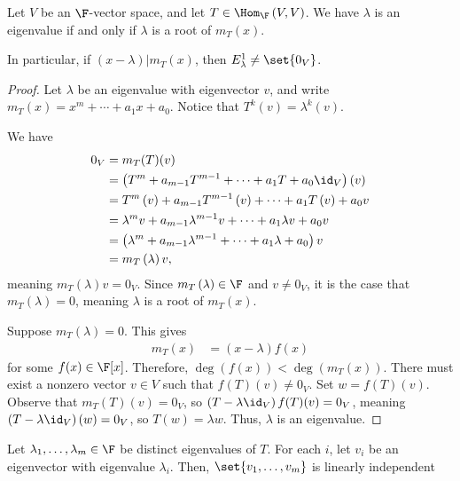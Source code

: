 \documentclass[10pt]{mypackage}
\begin{document}
\begin{theorem}
  Let $V$ be an $\F$-vector space, and let $T\in \Hom_{\F}\left(V,V\right)$. We have $\lambda$ is an eigenvalue if and only if $\lambda$ is a root of $m_{T}\left(x\right)$.\newline

  In particular, if $\left(x-\lambda\right)\vert m_T(x)$, then $E^{1}_{\lambda}\neq \set{0_V}$.
\end{theorem}
\begin{proof}
  Let $\lambda$ be an eigenvalue with eigenvector $v$, and write $m_{T}\left(x\right) = x^m + \cdots + a_1x + a_0$. Notice that $T^{k}\left(v\right) = \lambda^{k}\left(v\right)$.\newline

  We have 
  \begin{align*}
    0_V &= m_T(T)(v)\\
        &= \left(T^{m} + a_{m-1}T^{m-1} + \cdots + a_1T + a_0\id_V\right)\left(v\right)\\
        &= T^{m}\left(v\right) + a_{m-1}T^{m-1}\left(v\right) + \cdots + a_1T\left(v\right) + a_0 v\\
        &= \lambda^{m}v + a_{m-1}\lambda^{m-1}v + \cdots + a_1\lambda v + a_0 v\\
        &= \left(\lambda^{m} + a_{m-1}\lambda^{m-1} + \cdots + a_1\lambda + a_0\right)v\\
        &= m_{T}\left(\lambda\right)v,
  \end{align*}
  meaning $m_T\left(\lambda\right)v = 0_V$. Since $m_T\left(\lambda\right)\in \F$ and $v \neq 0_V$, it is the case that $m_T\left(\lambda\right) = 0$, meaning $\lambda$ is a root of $m_T(x)$.\newline

  Suppose $m_T\left(\lambda\right) = 0$. This gives
  \begin{align*}
    m_T\left(x\right) &= \left(x-\lambda\right)f(x)
  \end{align*}
  for some $f(x)\in \F[x]$. Therefore, $\deg\left(f(x)\right) < \deg \left(m_{T}\left(x\right)\right)$. There must exist a nonzero vector $v\in V$ such that $f(T)(v) \neq 0_V$. Set $w = f(T)(v)$. Observe that $m_T(T)(v) = 0_V$, so $\left(T-\lambda\id_V\right)f(T)(v) = 0_V$, meaning $\left(T-\lambda\id_V\right)\left(w\right) = 0_V$, so $T(w) = \lambda w$. Thus, $\lambda$ is an eigenvalue.
\end{proof}
\begin{corollary}
  Let $\lambda_1,\dots,\lambda_m\in \F$ be distinct eigenvalues of $T$. For each $i$, let $v_i$ be an eigenvector with eigenvalue $\lambda_i$. Then, $\set{v_1,\dots,v_m}$ is linearly independent 
\end{corollary}
\end{document}
